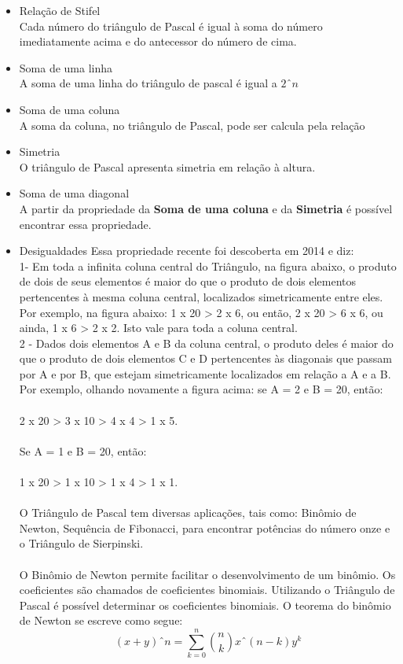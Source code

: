 \documentclass[a4paper, 12pt]{article}
\begin{document}
\begin{enumerate}
\begin{itemize}
\item Relação de Stifel\\
Cada número do triângulo de Pascal é igual à soma do número imediatamente acima e do antecessor do número de cima.
\item Soma de uma linha\\
A soma de uma linha do triângulo de pascal é igual a $2ˆn$
\item Soma de uma coluna\\
A soma da coluna, no triângulo de Pascal, pode ser calcula pela relação
\item Simetria\\
O triângulo de Pascal apresenta simetria em relação à altura.
\item Soma de uma diagonal\\
A partir da propriedade da \textbf{Soma de uma coluna} e da \textbf{Simetria} é possível encontrar essa propriedade.
\item Desigualdades
Essa propriedade recente foi descoberta em 2014 e diz: \\
1- Em toda a infinita coluna central do Triângulo, na figura abaixo, o produto de dois de seus elementos é maior do que o produto de dois elementos pertencentes à mesma coluna central, localizados simetricamente entre eles. Por exemplo, na figura abaixo: 1 x 20 > 2 x 6, ou então, 2 x 20 > 6 x 6, ou ainda, 1 x 6 > 2 x 2. Isto vale para toda a coluna central.\\
2 - Dados dois elementos A e B da coluna central, o produto deles é maior do que o produto de dois elementos C e D pertencentes às diagonais que passam por A e por B, que estejam simetricamente localizados em relação a A e a B. Por exemplo, olhando novamente a figura acima: se A = 2 e B = 20, então:\\\\

2 x 20 > 3 x 10 > 4 x 4 > 1 x 5.\\\\

Se A = 1 e B = 20, então:\\\\

1 x 20 > 1 x 10 > 1 x 4 > 1 x 1.\\\\

O Triângulo de Pascal tem diversas aplicações, tais como: Binômio de Newton, Sequência de Fibonacci, para encontrar potências do número onze e o Triângulo de Sierpinski.\\\\

O Binômio de Newton permite facilitar o desenvolvimento de um binômio. Os coeficientes são chamados de coeficientes binomiais. Utilizando o Triângulo de Pascal é possível determinar os coeficientes binomiais. O teorema do binômio de Newton se escreve como segue:
$$(x+y)ˆn=\sum_{k=0}^{n}\binom{n}{k}xˆ(n-k)y^k$$
\end{itemize}
\end{enumerate}
\end{document}
